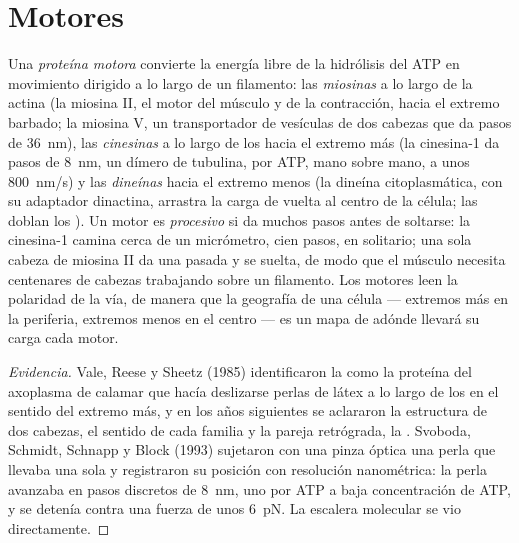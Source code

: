 \section{Motores}

\begin{definition}\label{def:b3:cytoskeleton-motility:motors}
Una \emph{proteína motora} convierte la energía libre de la hidrólisis
del ATP en movimiento dirigido a lo largo de un filamento: las
\emph{miosinas} a lo largo de la actina (la miosina II, el motor del
músculo y de la contracción, hacia el extremo barbado; la miosina V, un
transportador de vesículas de dos cabezas que da pasos de \qty{36}{nm}),
las \emph{cinesinas} a lo largo de los  hacia el extremo más
(la cinesina-1 da pasos de \qty{8}{nm}, un dímero de tubulina, por ATP,
mano sobre mano, a unos \qty{800}{nm/s}) y las \emph{dineínas} hacia el
extremo menos (la dineína citoplasmática, con su adaptador dinactina,
arrastra la carga de vuelta al centro de la célula; las  doblan los ). Un motor es \emph{procesivo} si da muchos
pasos antes de soltarse: la cinesina-1 camina cerca de un micrómetro, cien
pasos, en solitario; una sola cabeza de miosina II da una pasada y se
suelta, de modo que el músculo necesita centenares de cabezas trabajando
sobre un filamento. Los motores leen la polaridad de la vía, de manera
que la geografía de una célula --- extremos más en la periferia, extremos
menos en el centro --- es un mapa de adónde llevará su carga cada motor.
\end{definition}

\begin{proof}[Evidencia]
Vale, Reese y Sheetz (1985) identificaron la  como la proteína
del axoplasma de calamar que hacía deslizarse perlas de látex a lo largo
de los  en el sentido del extremo más, y en los años
siguientes se aclararon la estructura de dos cabezas, el sentido de cada
familia y la pareja retrógrada, la . Svoboda, Schmidt, Schnapp y
Block (1993) sujetaron con una pinza óptica una perla que llevaba una
sola  y registraron su posición con resolución nanométrica: la
perla avanzaba en pasos discretos de \qty{8}{nm}, uno por ATP a baja
concentración de ATP, y se detenía contra una fuerza de unos
\qty{6}{pN}. La escalera molecular se vio directamente.
\end{proof}

